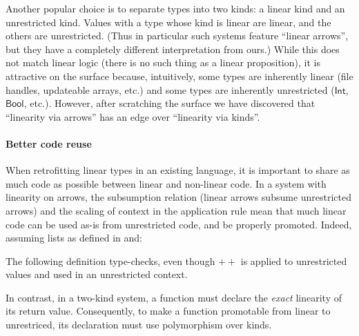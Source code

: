 \documentclass[acmsmall,screen]{acmart}\settopmatter{}
\newcommand{\Conid}[1]{\mathit{#1}}
\newcommand{\Varid}[1]{\mathit{#1}}
\newcommand{\plus}{\mathbin{+\!\!\!+}}
\def\resethooks{%
  \global\let\SaveRestoreHook\empty
  \global\let\ColumnHook\empty}
\let\hspre\empty
\let\hspost\empty
\renewcommand\Varid[1]{\mathord{\textsf{#1}}}
\renewcommand\Conid[1]{\mathord{\textsf{#1}}}
\begin{document}
Another popular choice
\cite{wadler_linear_1990,mazurak_lightweight_2010,morris_best_2016,tov_practical_2011}
is to separate types into two kinds: a linear kind and an unrestricted
kind. Values with a type whose kind is linear are linear, and the
others are unrestricted. (Thus in particular such systems feature
``linear arrows'', but they have a completely different interpretation
from ours.) While this does not match linear logic (there is no such
thing as a linear proposition), it is attractive on the surface
because, intuitively, some types are inherently linear (file handles,
updateable arrays, etc.) and some types are inherently unrestricted
(\ensuremath{\Conid{Int}}, \ensuremath{\Conid{Bool}}, etc.).  However, after scratching the surface we have
discovered that ``linearity via arrows'' has an edge over ``linearity
via kinds''.


\paragraph{Better code reuse}  When retrofitting linear types
  in an existing language, it is important to share as much code as
  possible between linear and non-linear code. In a system with
  linearity on arrows, the subsumption relation (linear arrows subsume
  unrestricted arrows) and the scaling of context in the application
  rule mean that much linear code can be used as-is from unrestricted
  code, and be properly promoted. Indeed, assuming lists as defined in
   and:
  \resethooks
  The following definition type-checks, even though \ensuremath{\plus } is applied to
  unrestricted values and used in an unrestricted context.
  \resethooks
  In contrast, in a two-kind system, a function must declare the
  \emph{exact} linearity of its return value. Consequently, to make a
  function promotable from linear to unrestriced, its declaration must
  use polymorphism over kinds.
\end{document}
